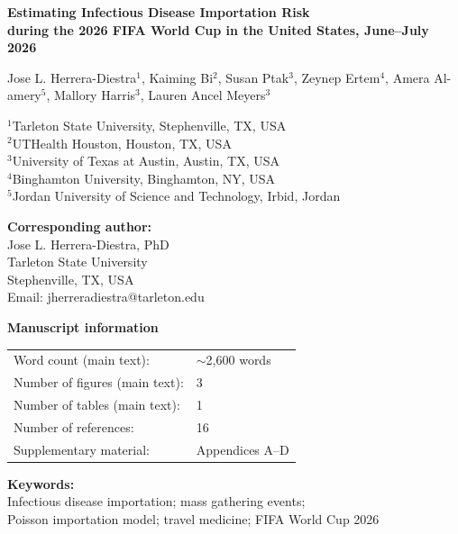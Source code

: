 \documentclass[12pt]{article}
\begin{document}
\thispagestyle{empty}

\begin{center}

{\Large \textbf{Estimating Infectious Disease Importation Risk\\
during the 2026 FIFA World Cup in the United States, June--July 2026}}

\vspace{1.5cm}

Jose L. Herrera-Diestra$^{1}$,
Kaiming Bi$^{2}$,
Susan Ptak$^{3}$,
Zeynep Ertem$^{4}$,
Amera Al-amery$^{5}$,
Mallory Harris$^{3}$,
Lauren Ancel Meyers$^{3}$

\vspace{1cm}

$^{1}$Tarleton State University, Stephenville, TX, USA\\
$^{2}$UTHealth Houston, Houston, TX, USA\\
$^{3}$University of Texas at Austin, Austin, TX, USA\\
$^{4}$Binghamton University, Binghamton, NY, USA\\
$^{5}$Jordan University of Science and Technology, Irbid, Jordan

\vspace{1.5cm}

\textbf{Corresponding author:}\\
Jose L. Herrera-Diestra, PhD\\
Tarleton State University\\
Stephenville, TX, USA\\
Email: jherreradiestra@tarleton.edu

\vspace{1.5cm}

\textbf{Manuscript information}\\[0.3cm]
\begin{tabular}{ll}
Word count (main text): & $\sim$2,600 words \\
Number of figures (main text): & 3 \\
Number of tables (main text): & 1 \\
Number of references: & 16 \\
Supplementary material: & Appendices A--D \\
\end{tabular}

\vspace{1.5cm}

\textbf{Keywords:}\\
Infectious disease importation; mass gathering events;\\
Poisson importation model; travel medicine; FIFA World Cup 2026

\end{center}
\end{document}
